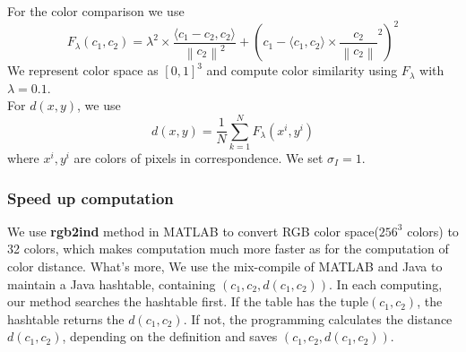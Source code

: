 \documentclass{article} %
\begin{document}
        For the color comparison we use
        \begin{equation}
        	F_{\lambda}(c_{1},c_{2}) = {\lambda}^{2} \times \frac{\langle c_{1}-c_{2}, c_{2} \rangle }{ {\left \| c_{2} \right \|}^{2} } + \left(c_{1}-  {\langle c_{1},c_{2} \rangle} \times \frac{c_{2}}{\left \| c_{2} \right \|}^{2}\right)^{2}
        \end{equation}
        We represent color space as $[0,1]^{3}$ and compute color similarity using $F_{\lambda}$ with $\lambda = 0.1 $.\\
        For $d(x,y)$, we use
        \begin{equation}
            d(x,y) = \frac{1}{N} \sum_{k=1}^N  F_{\lambda}\left({x^{i},y^{i}}\right)
        \end{equation}
        where $x^{i}, y^{i}$ are colors of pixels in correspondence. We set $\sigma_{I} = 1 $.


        \subsubsection{Speed up computation}

        We use \textbf{rgb2ind} method in MATLAB to convert RGB color space($256^3$ colors) to 32 colors, which makes computation much more faster as for the computation of color distance. What's more, We use the mix-compile of MATLAB and Java to maintain a Java hashtable, containing $\left(c_{1},c_{2},d(c_{1},c_{2})\right)$. In each computing, our method searches the hashtable first. If the table has the tuple$(c_{1},c_{2})$, the hashtable returns the $d(c_{1},c_{2})$. If not, the programming calculates the distance $d(c_{1},c_{2})$, depending on the definition and saves $\left(c_{1},c_{2},d(c_{1},c_{2})\right)$.
\end{document}
